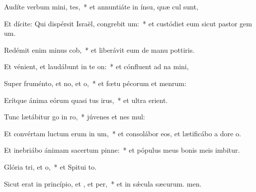\item Audíte verbum mini, tes,~* et annuntiáte in ínsu, quæ cul sunt,
\item Et dícite: Qui dispérsit Israël, congrebit um:~* et custódiet eum sicut pastor gem um.
\item Redémit enim minus cob,~* et liberávit eum de manu pottiris.
\item Et vénient, et laudábunt in te on:~* et cónfluent ad na mini,
\item Super fruménto, et no, et o,~* et fœtu pécorum et menrum:
\item Erítque ánima eórum quasi tus irus,~* et ultra  erient.
\item Tunc lætábitur go in ro,~* júvenes et nes mul:
\item Et convértam luctum erum in um,~* et consolábor eos, et lætificábo a dore o.
\item Et inebriábo ánimam sacertum pinne:~* et pópulus meus bonis meis imbitur.
\item Glória tri, et o,~* et Spitui to.
\item Sicut erat in princípio, et , et per,~* et in sǽcula sæcurum. men.
